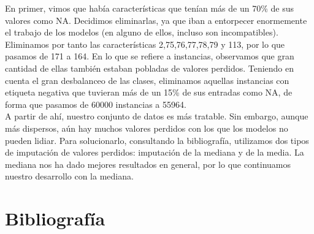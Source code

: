 En primer, vimos que había características que tenían más de un 70\% de sus valores como NA. Decidimos eliminarlas, ya que iban a entorpecer enormemente el trabajo de los modelos (en alguno de ellos, incluso son incompatibles). Eliminamos por tanto las características 2,75,76,77,78,79 y 113, por lo que pasamos de 171 a 164. En lo que se refiere a instancias, observamos que gran cantidad de ellas también estaban pobladas de valores perdidos. Teniendo en cuenta el gran desbalanceo de las clases, eliminamos aquellas instancias con etiqueta negativa que tuvieran más de un 15\% de sus entradas como NA, de forma que pasamos de 60000 instancias a 55964. \\

A partir de ahí, nuestro conjunto de datos es más tratable. Sin embargo, aunque más dispersos, aún hay muchos valores perdidos con los que los modelos no pueden lidiar. Para solucionarlo, consultando la bibliografía, utilizamos dos tipos de imputación de valores perdidos: imputación de la mediana y de la media. La mediana nos ha dado mejores resultados en general, por lo que continuamos nuestro desarrollo con la mediana. 





\newpage
\section{Bibliografía}




